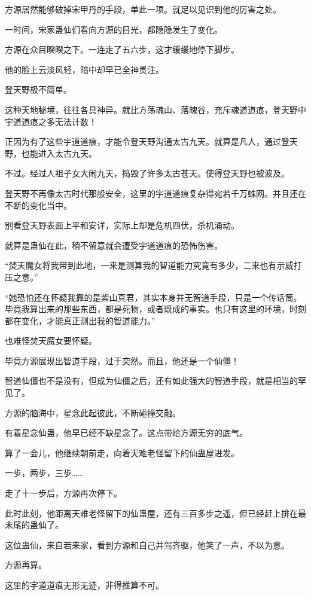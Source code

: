 \begin{this_body}
方源居然能够破掉宋甲丹的手段，单此一项。就足以见识到他的厉害之处。

一时间，宋家蛊仙们看向方源的目光，都隐隐发生了变化。

方源在众目睽睽之下。一连走了五六步，这才缓缓地停下脚步。

他的脸上云淡风轻，暗中却早已全神贯注。

登天野极不简单。

这种天地秘境，往往各具神异。就比方荡魂山、落魄谷，充斥魂道道痕，登天野中宇道道痕之多无法计数！

正因为有了这些宇道道痕，才能令登天野沟通太古九天。就算是凡人，通过登天野，也能进入太古九天。

不过。经过人祖子女大闹九天，捣毁了许多太古苍天。使得登天野也被波及。

登天野不再像太古时代那般安全，这里的宇道道痕复杂得宛若千万蛛网。并且还在不断的变化当中。

别看登天野表面上平和安详，实际上却是危机四伏，杀机涌动。

就算是蛊仙在此，稍不留意就会遭受宇道道痕的恐怖伤害。

“焚天魔女将我带到此地，一来是测算我的智道能力究竟有多少，二来也有示威打压之意。”

“她恐怕还在怀疑我靠的是紫山真君，其实本身并无智道手段，只是一个传话筒。毕竟我算出来的那些东西，都是死物，或者既成的事实。也只有这里的环境，时刻都在变化，才能真正测出我的智道能力。”

也难怪焚天魔女要怀疑。

毕竟方源展现出智道手段，过于突然。而且，他还是一个仙僵！

智道仙僵也不是没有，但成为仙僵之后，还有如此强大的智道手段，就是相当的罕见了。

方源的脑海中，星念此起彼此，不断碰撞交融。

有着星念仙蛊，他早已经不缺星念了。这点带给方源无穷的底气。

算了一会儿，他继续朝前走，向着天难老怪留下的仙蛊屋进发。

一步，两步，三步……

走了十一步后，方源再次停下。

此时此刻，他距离天难老怪留下的仙蛊屋，还有三百多步之遥，但已经赶上排在最末尾的蛊仙了。

这位蛊仙，来自若来家，看到方源和自己并驾齐驱，他笑了一声，不以为意。

方源再算。

这里的宇道道痕无形无迹，非得推算不可。


\end{this_body}
